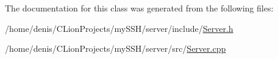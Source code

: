 The documentation for this class was generated from the following files\+:\begin{DoxyCompactItemize}
\item 
/home/denis/\+C\+Lion\+Projects/my\+S\+S\+H/server/include/\hyperlink{Server_8h}{Server.\+h}\item 
/home/denis/\+C\+Lion\+Projects/my\+S\+S\+H/server/src/\hyperlink{Server_8cpp}{Server.\+cpp}\end{DoxyCompactItemize}
